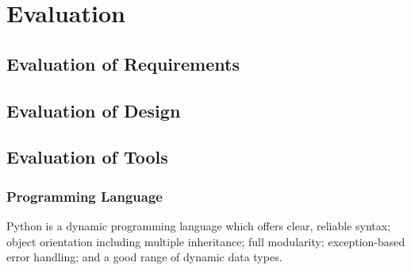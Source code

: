 \chapter{Evaluation}





\section{Evaluation of Requirements}


\section{Evaluation of Design}


\section{Evaluation of Tools}

\subsection{Programming Language}
Python is a dynamic programming language which offers clear, reliable syntax; object orientation
including multiple inheritance; full modularity; exception-based error handling; and a good range
of dynamic data types.

